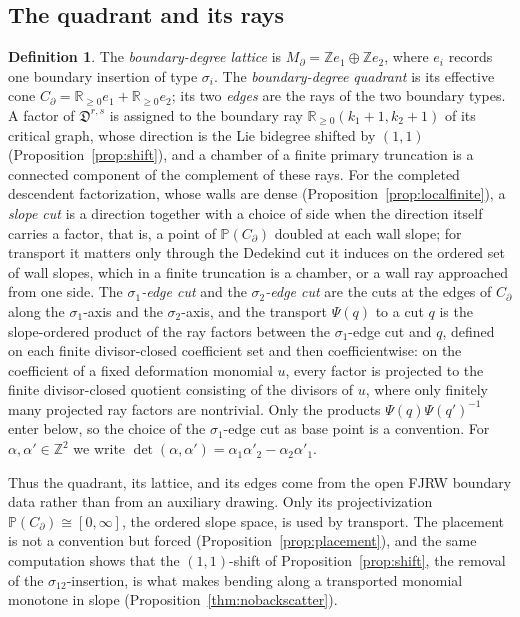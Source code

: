 \documentclass[11pt]{amsart}
\theoremstyle{definition}
\newtheorem{definition}[theorem]{Definition}
\theoremstyle{remark}
\newcommand{\ZZ}{\mathbb{Z}}
\newcommand{\RR}{\mathbb{R}}
\newcommand{\Dscr}{\mathfrak{D}}
\begin{document}
\subsection{The quadrant and its rays}
\label{ssec:sector}
\begin{definition}
\label{def:sector}
The \emph{boundary-degree lattice} is
$M_{\partial}=\ZZ e_{1}\oplus\ZZ e_{2}$, where $e_i$ records one boundary
insertion of type $\sigma_i$.  The \emph{boundary-degree quadrant} is its
effective cone $C_{\partial}=\RR_{\ge0}e_1+\RR_{\ge0}e_2$; its two \emph{edges}
are the rays of the two boundary types. A factor of $\Dscr^{r,s}$ is assigned
to the boundary ray $\RR_{\ge0}(k_{1}{+}1,k_{2}{+}1)$ of its critical graph,
whose direction is the Lie bidegree shifted by $(1,1)$
(Proposition~\ref{prop:shift}), and a chamber of a finite primary truncation is a connected
component of the complement of these rays. For the completed descendent
factorization, whose walls are dense (Proposition~\ref{prop:localfinite}), a
\emph{slope cut} is a direction together with a choice of side when the
direction itself carries a factor, that is, a point of
$\mathbb P(C_\partial)$ doubled at each wall slope; for transport it matters
only through the Dedekind cut it induces on the ordered set of wall slopes,
which in a finite truncation is a chamber, or a wall ray approached from one
side.  The \emph{$\sigma_1$-edge cut} and the \emph{$\sigma_2$-edge cut} are
the cuts at the edges of $C_\partial$ along the $\sigma_{1}$-axis and the
$\sigma_2$-axis, and the transport $\Psi(q)$ to a cut $q$ is the
slope-ordered product of the ray
factors between the $\sigma_1$-edge cut and $q$, defined on each finite
divisor-closed coefficient set and
then coefficientwise: on the coefficient of a fixed deformation monomial $u$,
every factor is projected to the finite divisor-closed quotient consisting of
the divisors of $u$, where only finitely many projected ray factors are
nontrivial.  Only the products $\Psi(q)\Psi(q')^{-1}$ enter below,
so the choice of the $\sigma_1$-edge cut as base point is a convention.  For
$\alpha,\alpha'\in\ZZ^{2}$ we write
$\det(\alpha,\alpha')=\alpha_{1}\alpha'_{2}-\alpha_{2}\alpha'_{1}$.
\end{definition}

Thus the quadrant, its lattice, and its edges come from the open FJRW boundary
data rather than from an auxiliary drawing. Only its projectivization
$\mathbb P(C_{\partial})\cong[0,\infty]$, the ordered slope space, is used by
transport. The placement is not a convention but forced
(Proposition~\ref{prop:placement}), and the same computation shows that the
$(1,1)$-shift of Proposition~\ref{prop:shift}, the removal of the
$\sigma_{12}$-insertion, is what makes bending along a transported monomial
monotone in slope (Proposition~\ref{thm:nobackscatter}).
\end{document}
